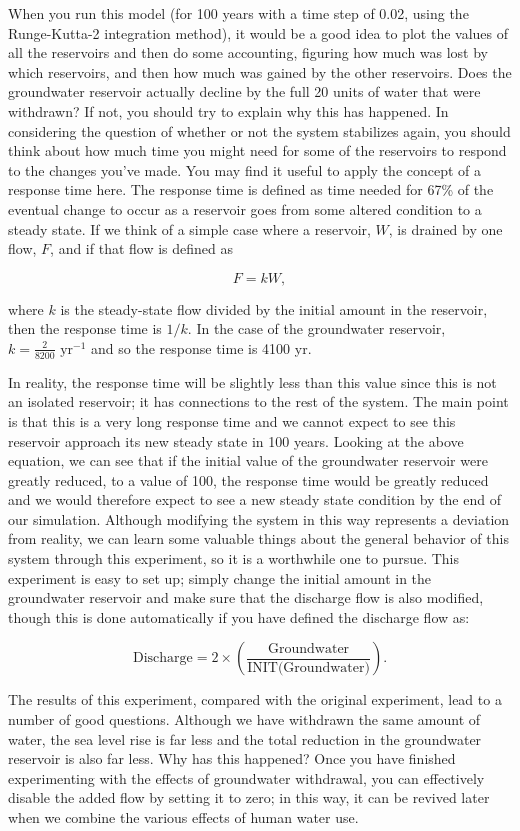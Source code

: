 \documentclass[11pt,letterpaper]{article}
\begin{document}
When you run this model (for 100 years with a time step of 0.02, using the Runge-Kutta-2 integration method), it would be a good idea to plot the values of all the reservoirs and then do some accounting, figuring how much was lost by which reservoirs, and then how much was gained by the other reservoirs. Does the groundwater reservoir actually decline by the full 20 units of water that were withdrawn? If not, you should try to explain why this has happened. In considering the question of whether or not the system stabilizes again, you should think about how much time you might need for some of the reservoirs to respond to the changes you've made. You may find it useful to apply the concept of a response time here. The response time is defined as time needed for 67\% of the eventual change to occur as a reservoir goes from some altered condition to a steady state. If we think of a simple
case where a reservoir, $W$, is drained by one flow, $F$, and if that flow is defined as

$$F=kW,$$

where $k$ is the steady-state flow divided by the initial amount in the reservoir, then the response time is $1/k$. In the case of the groundwater reservoir, $k=\frac{2}{8200}\mbox{ yr}^{-1}$ and so the response time is 4100 yr.

In reality, the response time will be slightly less than this value since this is not an isolated reservoir; it has connections to the rest of the system. The main point is that this is a very long response time and we cannot expect to see this reservoir approach its new steady state in 100 years. Looking at the above equation, we can see that if the initial value of the groundwater reservoir were greatly reduced, to a value of 100, the response time would be greatly reduced and we would therefore expect to see a new steady state condition by the end of our simulation. Although modifying the system in this way represents a deviation from reality, we can learn some valuable things about the general behavior of this system through this experiment, so it is a worthwhile one to pursue. This experiment is easy to set up; simply change the initial amount in the groundwater reservoir and make sure that the discharge flow is also modified, though this is done automatically if you have defined the discharge flow as:

$$\mbox{Discharge} = 2\times\left(\frac{\mbox{Groundwater}}{\mbox{INIT(Groundwater)}}\right).$$

The results of this experiment, compared with the original experiment, lead to a number of good questions. Although we have withdrawn the same amount of water, the sea level rise is far less and the total reduction in the groundwater reservoir is also far less. Why has this happened? Once you have finished experimenting with the effects of groundwater withdrawal, you can effectively disable the added flow by setting it to zero; in this way, it can be revived later when we combine the various effects of human water use.
\end{document}

